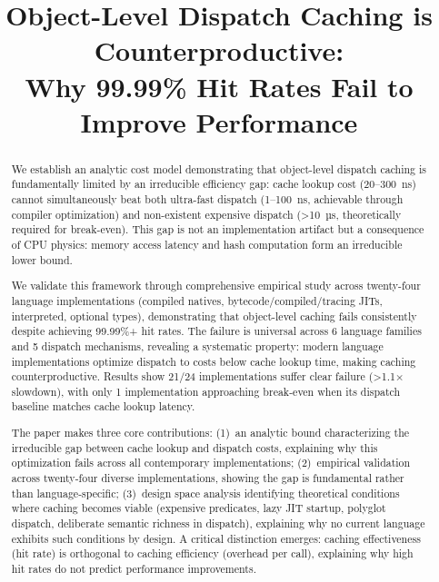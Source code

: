 \documentclass[sigplan,final,acmsmall,review,screen]{acmart}
\begin{document}
\title{Object-Level Dispatch Caching is                                                       Counterproductive: \\Why 99.99\% Hit Rates Fail to Improve Performance}


\begin{abstract}
  We establish an analytic cost model demonstrating that object-level dispatch caching is fundamentally limited by an irreducible efficiency gap:
  cache lookup cost (20--300~ns) cannot simultaneously beat both ultra-fast dispatch (1--100~ns, achievable through compiler optimization) and
  non-existent expensive dispatch (>10~µs, theoretically required for break-even). This gap is not an implementation artifact but a consequence
  of CPU physics: memory access latency and hash computation form an irreducible lower bound.

  We validate this framework through comprehensive empirical study across twenty-four language implementations (compiled natives, bytecode/compiled/tracing JITs,
  interpreted, optional types), demonstrating that object-level caching fails consistently despite achieving 99.99\%+ hit rates. The failure is universal
  across 6 language families and 5 dispatch mechanisms, revealing a systematic property: modern language implementations optimize dispatch to costs below
  cache lookup time, making caching counterproductive. Results show 21/24 implementations suffer clear failure (>1.1× slowdown), with only 1 implementation
  approaching break-even when its dispatch baseline matches cache lookup latency.

  The paper makes three core contributions: (1)~an analytic bound characterizing the irreducible gap between cache lookup and dispatch costs, explaining why
  this optimization fails across all contemporary implementations; (2)~empirical validation across twenty-four diverse implementations, showing the gap is
  fundamental rather than language-specific; (3)~design space analysis identifying theoretical conditions where caching becomes viable (expensive predicates,
  lazy JIT startup, polyglot dispatch, deliberate semantic richness in dispatch), explaining why no current language exhibits such conditions by design.
  A critical distinction emerges: caching effectiveness (hit rate) is orthogonal to caching efficiency (overhead per call), explaining why high hit rates
  do not predict performance improvements.
\end{abstract}
\end{document}
